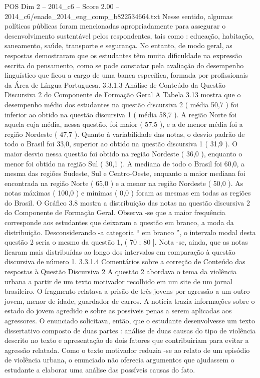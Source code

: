 \begin{textsample}{POS Dim 2 – 2014\_c6 – Score 2.00 – 2014\_c6/enade\_2014\_eng\_comp\_b822534664.txt}
Nesse sentido, algumas políticas públicas foram mencionadas apropriadamente para assegurar o desenvolvimento sustentável pelos respondentes, tais como : educação, habitação, saneamento, saúde, transporte e segurança.
No entanto, de modo geral, as respostas demostraram que os estudantes têm muita dificuldade na expressão escrita do pensamento, como se pode constatar pela avaliação do desempenho linguístico que ficou a cargo de uma banca específica, formada por profissionais da Área de Língua Portuguesa. 3.3.1.3 Análise de Conteúdo da Questão Discursiva 2 do Componente de Formação Geral A Tabela 3.13 mostra que o desempenho médio dos estudantes na questão discursiva 2 ( média 50,7 ) foi inferior ao obtido na questão discursiva 1 ( média 58,7 ).
A região Norte foi aquela cuja média, nessa questão, foi maior ( 57,5 ), e a de menor média foi a região Nordeste ( 47,7 ).
Quanto à variabilidade das notas, o desvio padrão de todo o Brasil foi 33,0, superior ao obtido na questão discursiva 1 ( 31,9 ).
O maior desvio nessa questão foi obtido na região Nordeste ( 36,0 ), enquanto o menor foi obtido na região Sul ( 30,1 ).
A mediana de todo o Brasil foi 60,0, a mesma das regiões Sudeste, Sul e Centro-Oeste, enquanto a maior mediana foi encontrada na região Norte ( 65,0 ) e a menor na região Nordeste ( 50,0 ).
As notas máximas ( 100,0 ) e mínimas ( 0,0 ) foram as mesmas em todas as regiões do Brasil.
O Gráfico 3.8 mostra a distribuição das notas na questão discursiva 2 do Componente de Formação Geral.
Observa -se que a maior frequência corresponde aos estudantes que deixaram a questão em branco, a moda da distribuição.
Desconsiderando -a categoria “ em branco ”, o intervalo modal desta questão 2 seria o mesmo da questão 1, ( 70 ; 80 ].
Nota -se, ainda, que as notas ficaram mais distribuídas ao longo dos intervalos em comparação à questão discursiva de número 1. 3.3.1.4 Comentários sobre a correção de Conteúdo das respostas à Questão Discursiva 2 A questão 2 abordava o tema da violência urbana a partir de um texto motivador recolhido em um site de um jornal brasileiro.
O fragmento relatava a prisão de três jovens por agressão a um outro jovem, menor de idade, guardador de carros.
A notícia trazia informações sobre o estado do jovem agredido e sobre as possíveis penas a serem aplicadas aos agressores.
O enunciado solicitava, então, que o estudante desenvolvesse um texto dissertativo composto de duas partes : análise de duas causas do tipo de violência descrito no texto e apresentação de dois fatores que contribuiriam para evitar a agressão relatada.
Como o texto motivador reduzia -se ao relato de um episódio de violência urbana, o enunciado não oferecia argumentos que ajudassem o estudante a elaborar uma análise das possíveis causas do fato.

\end{textsample}
